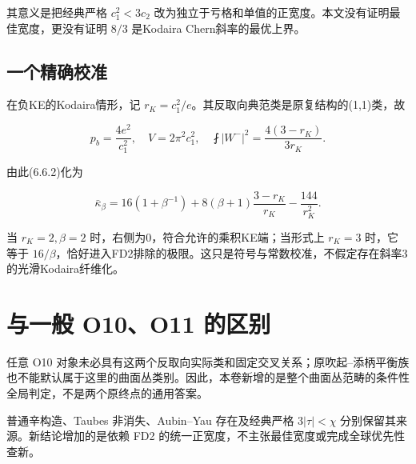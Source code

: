 \documentclass[UTF8,11pt,fontset=none]{ctexart}
\theoremstyle{definition}
\theoremstyle{remark}
\begin{document}
其意义是把经典严格 \(c_1^2<3c_2\) 改为独立于亏格和单值的正宽度。本文没有证明最佳宽度，更没有证明 \(8/3\) 是Kodaira Chern斜率的最优上界。

\subsection{一个精确校准}\label{v6-ux4e00ux4e2aux7cbeux786eux6821ux51c6}

在负KE的Kodaira情形，记 \(r_K=c_1^2/e\)。其反取向典范类是原复结构的(1,1)类，故

\[
p_b=\frac{4e^2}{c_1^2},\quad
V=2\pi^2 c_1^2,\quad
\fint|W^-|^2=\frac{4(3-r_K)}{3r_K}.
\]

由此(6.6.2)化为

\[
\bar\kappa_\beta
=16(1+\beta^{-1})
+8(\beta+1)\frac{3-r_K}{r_K}
-\frac{144}{r_K^2}.
\tag{6.7.2}
\]

当 \(r_K=2,\beta=2\) 时，右侧为0，符合允许的乘积KE端；当形式上 \(r_K=3\) 时，它等于 \(16/\beta\)，恰好进入FD2排除的极限。这只是符号与常数校准，不假定存在斜率3的光滑Kodaira纤维化。

\section{与一般 O10、O11 的区别}\label{v6-ux4e0eux4e00ux822c-o10o11-ux7684ux533aux522b}

任意 O10 对象未必具有这两个反取向实际类和固定交叉关系；原吹起--添柄平衡族也不能默认属于这里的曲面丛类别。因此，本卷新增的是整个曲面丛范畴的条件性全局判定，不是两个原终点的通用答案。

普通辛构造、Taubes 非消失、Aubin--Yau 存在及经典严格 \(3|\tau|<\chi\) 分别保留其来源。新结论增加的是依赖 FD2 的统一正宽度，不主张最佳宽度或完成全球优先性查新。\cite{Thurston1976,Taubes1994,CataneseRollenske}
\end{document}
